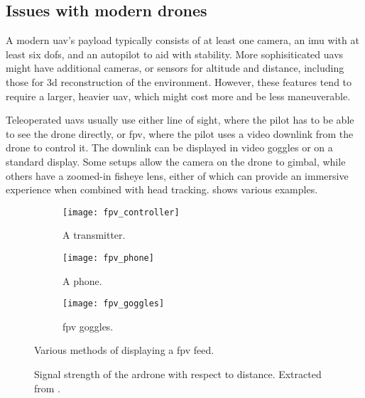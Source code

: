 \subsection{Issues with modern drones}
A modern \gls{uav}'s payload typically consists of at least one camera, an \gls{imu} with at least six \glspl{dof}, and an autopilot to aid with stability.
More sophisiticated \glspl{uav} might have additional cameras, or sensors for altitude and distance, including those for \gls{3d} reconstruction of the environment.
However, these features tend to require a larger, heavier \gls{uav}, which might cost more and be less maneuverable.

Teleoperated \glspl{uav} usually use either line of sight, where the pilot has to be able to see the drone directly, or \gls{fpv}, where the pilot uses a video downlink from the drone to control it.
The downlink can be displayed in video goggles or on a standard display.
Some setups allow the camera on the drone to gimbal, while others have a zoomed-in fisheye lens, either of which can provide an immersive experience when combined with head tracking.
 shows various examples.

\begin{figure}[h]
  \centering
  \begin{subfigure}[b]{0.3\textwidth}
    \texttt{[image: fpv\_controller]}
    \caption{A transmitter.\cite{fpv_controller}}
    \label{fig:fpv_controller}
  \end{subfigure}
  \hfill
  \begin{subfigure}[b]{0.3\textwidth}
    \texttt{[image: fpv\_phone]}
    \caption{A phone.\cite{fpv_phone}}
    \label{fig:fpv_phone}
  \end{subfigure}
  \hfill
  \begin{subfigure}[b]{0.3\textwidth}
    \texttt{[image: fpv\_goggles]}
    \caption{\gls{fpv} goggles.\cite{fpv_goggles}}
    \label{fig:fpv_goggles}
  \end{subfigure}
  \caption[\acrshort{fpv} display methods]{Various methods of displaying a \gls{fpv} feed.}
  \label{fig:fpv_various}
\end{figure}

\begin{wrapfigure}{r}{0.47\textwidth}
  \centering
  
  \caption[AR.Drone signal profile]{
    Signal strength of the \gls{ardrone} with respect to distance.
    Extracted from \cite{ardrone_dos}.
  }
  \label{fig:ardrone_dos}
\end{wrapfigure}

